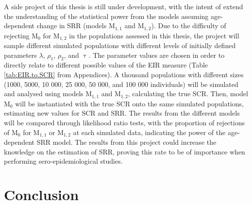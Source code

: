 A side project of this thesis is still under development, with the intent of extend the understanding of the statistical power from the models assuming age-dependent change in SRR (models M$_{1,1}$ and M$_{1,2}$).
Due to the difficulty of rejecting M$_0$ for M$_{1,2}$ in the populations assessed in this thesis, the project will sample different simulated populations with different levels of initially defined parameters $\lambda$, $\rho_1$, $\rho_2$, and $\uptau$.
The parameter values are chosen in order to directly relate to different possible values of the EIR measure (Table \ref{tab:EIR.to.SCR} from Appendices).
A thousand populations with different sizes (1000, 5000, 10 000, 25 000, 50 000, and 100 000 individuals) will be simulated and analysed using models M$_{1,1}$ and M$_{1,2}$, calculating the true SCR.
Then, model M$_0$ will be instantiated with the true SCR onto the same simulated populations, estimating new values for SCR and SRR.
The results from the different models will be compared through likelihood ratio tests, with the proportion of rejections of M$_0$ for M$_{1,1}$ or M$_{1,2}$ at each simulated data, indicating the power of the age-dependent SRR model.
The results from this project could increase the knowledge on the estimation of SRR, proving this rate to be of importance when performing sero-epidemiological studies.

\newpage
\section{Conclusion}


